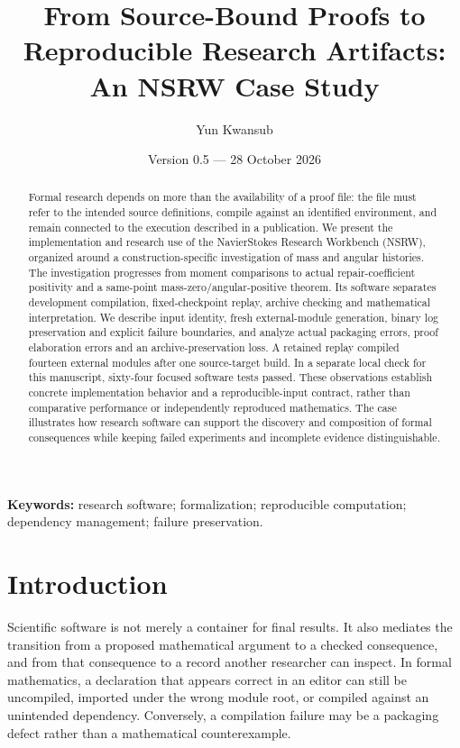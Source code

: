 \documentclass[11pt,a4paper]{article}
\author{Yun Kwansub}
\date{Version 0.5 --- 28 October 2026}
\title{From Source-Bound Proofs to Reproducible Research Artifacts: An NSRW Case Study}
\begin{document}
\maketitle
\begin{abstract}

Formal research depends on more than the availability of a proof file: the file must refer to the intended source definitions, compile against an identified environment, and remain connected to the execution described in a publication. We present the implementation and research use of the NavierStokes Research Workbench (NSRW), organized around a construction-specific investigation of mass and angular histories. The investigation progresses from moment comparisons to actual repair-coefficient positivity and a same-point mass-zero/angular-positive theorem. Its software separates development compilation, fixed-checkpoint replay, archive checking and mathematical interpretation. We describe input identity, fresh external-module generation, binary log preservation and explicit failure boundaries, and analyze actual packaging errors, proof elaboration errors and an archive-preservation loss. A retained replay compiled fourteen external modules after one source-target build. In a separate local check for this manuscript, sixty-four focused software tests passed. These observations establish concrete implementation behavior and a reproducible-input contract, rather than comparative performance or independently reproduced mathematics. The case illustrates how research software can support the discovery and composition of formal consequences while keeping failed experiments and incomplete evidence distinguishable.

\end{abstract}
\noindent \textbf{Keywords:} research software; formalization; reproducible computation; dependency management; failure preservation.

\section{Introduction}

Scientific software is not merely a container for final results. It also mediates the transition from a proposed mathematical argument to a checked consequence, and from that consequence to a record another researcher can inspect. In formal mathematics, a declaration that appears correct in an editor can still be uncompiled, imported under the wrong module root, or compiled against an unintended dependency. Conversely, a compilation failure may be a packaging defect rather than a mathematical counterexample.
\end{document}
